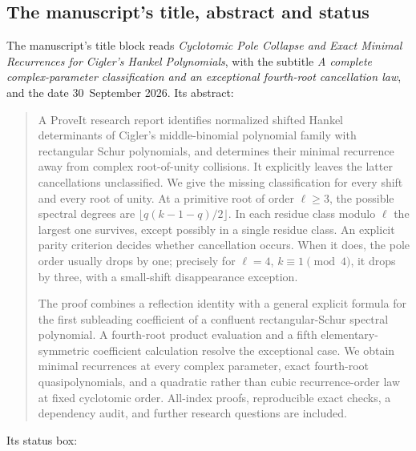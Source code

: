 \documentclass[11pt]{article}
\theoremstyle{definition}
\theoremstyle{remark}
\theoremstyle{definition}
\theoremstyle{plain}
\numberwithin{equation}{section}
\begin{document}
\subsection{The manuscript's title, abstract and status}
\label{cp:sec:front}
The manuscript's title block reads \emph{Cyclotomic Pole Collapse and Exact
Minimal Recurrences for Cigler's Hankel Polynomials}, with the subtitle
\emph{A complete complex-parameter classification and an exceptional
fourth-root cancellation law}, and the date 30~September 2026. Its
abstract:
\begin{quote}\small
A ProveIt research report identifies normalized shifted Hankel determinants of
Cigler's middle-binomial polynomial family with rectangular Schur polynomials,
and determines their minimal recurrence away from complex root-of-unity
collisions. It explicitly leaves the latter cancellations unclassified.
We give the missing classification for every shift and every root of unity.
At a primitive root of order $\ell\ge3$, the possible spectral degrees are
$\lfloor q(k-1-q)/2\rfloor$. In each residue class modulo $\ell$ the largest
one survives, except possibly in a single residue class. An explicit parity
criterion decides whether cancellation occurs. When it does, the pole order
usually drops by one; precisely for $\ell=4$, $k\equiv1\pmod4$, it drops by
three, with a small-shift disappearance exception.

The proof combines a reflection identity with a general explicit formula for
the first subleading coefficient of a confluent rectangular-Schur spectral
polynomial. A fourth-root product evaluation and a fifth elementary-symmetric
coefficient calculation resolve the exceptional case. We obtain minimal
recurrences at every complex parameter, exact fourth-root quasipolynomials,
and a quadratic rather than cubic recurrence-order law at fixed cyclotomic
order. All-index proofs, reproducible exact checks, a dependency audit, and
further research questions are included.
\end{quote}
Its status box:

\medskip
\noindent{}
\medskip
\end{document}
